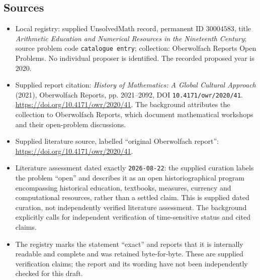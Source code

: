 \documentclass[11pt]{article}
\begin{document}
\subsection{Sources}
\begin{itemize}
\item Local registry: supplied UnsolvedMath record, permanent ID \(30004583\), title \emph{Arithmetic Education and Numerical Resources in the Nineteenth Century}; source problem code \texttt{catalogue entry}; collection: Oberwolfach Reports Open Problems. No individual proposer is identified. The recorded proposed year is 2020.
\item Supplied report citation: \emph{History of Mathematics: A Global Cultural Approach} (2021), Oberwolfach Reports, pp. 2021--2092, DOI \texttt{10.4171/owr/2020/41}. \url{https://doi.org/10.4171/owr/2020/41}. The background attributes the collection to Oberwolfach Reports, which document mathematical workshops and their open-problem discussions.
\item Supplied literature source, labelled ``original Oberwolfach report'': \url{https://doi.org/10.4171/owr/2020/41}.
\item Literature assessment dated exactly \texttt{2026-08-22}: the supplied curation labels the problem ``open'' and describes it as an open historiographical program encompassing historical education, textbooks, measures, currency and computational resources, rather than a settled claim. This is supplied dated curation, not independently verified literature assessment. The background explicitly calls for independent verification of time-sensitive status and cited claims.
\item The registry marks the statement ``exact'' and reports that it is internally readable and complete and was retained byte-for-byte. These are supplied verification claims; the report and its wording have not been independently checked for this draft.
\end{itemize}
\end{document}

